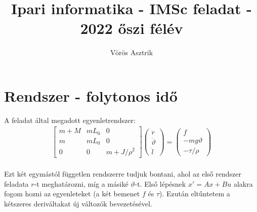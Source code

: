 \documentclass{article}
\title{Ipari informatika - IMSc feladat - 2022 őszi félév}
\author{Vörös Asztrik}
\date{}
\begin{document}
\maketitle

\newcommand{\dunderline}[1]{\underline{\underline{#1}}}
\newcommand{\zeros}[2]{\dunderline{0}_{#1 \times #2}}
\newcommand{\zerosV}[2]{\underline{0}_{#1 \times #2}}
\newcommand{\ZerosV}{\underline{0}}
\newcommand{\ZerosM}{\dunderline{0}}
\newcommand{\eye}[1]{\dunderline{I}_{#1 \times #1}}
\newcommand{\Eye}{\dunderline{I}}
\renewcommand{\vec}[1]{\underline{#1}}

\setlength\parindent{0pt}

\section{Rendszer - folytonos idő}
	A feladat által megadott egyenletrendszer: \\
	\begin{align}
		\begin{bmatrix}
			m+M & mL_0 & 0 \\
			m   & mL_0 & 0 \\
			0   & 0	& m+J/\rho^2
		\end{bmatrix}
		\begin{pmatrix}
			\ddot{r} \\
			\ddot{\vartheta} \\
			\ddot{l}
		\end{pmatrix}
		=
		\begin{pmatrix}
			f \\
			-mg\vartheta \\
			-\tau/\rho
		\end{pmatrix}
	\end{align}
	\\
	Ezt két egymástól független rendszerre tudjuk bontani, ahol az első rendszer feladata
	$r$-t meghatározni, míg a másiké $\vartheta$-t. Első lépésnek $x' = A x + Bu$ alakra fogom hozni az egyenleteket (a két bemenet $f$ és $\tau$). Ezután eltűntetem a kétszeres deriváltakat új változók bevezetésével.
	\\
\end{document}
